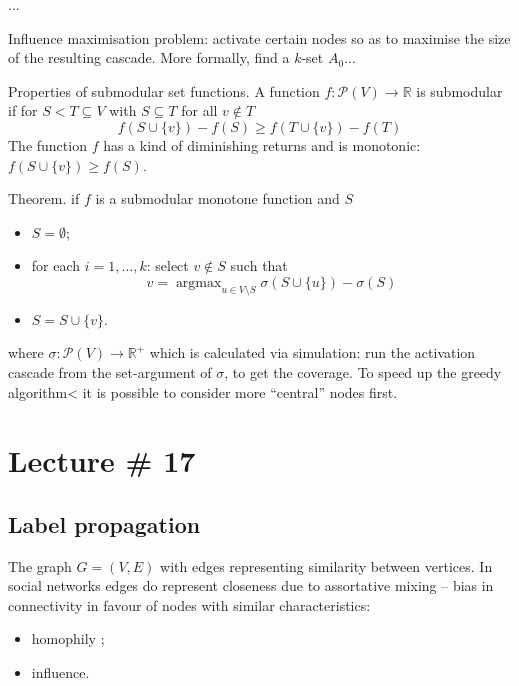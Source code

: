 \documentclass[a4paper]{article}
\newcommand{\Real}{\mathbb{R}}
\newcommand{\argmax}{\mathop{\text{argmax}}}
\begin{document}
...

Influence maximisation problem: activate certain nodes so as to maximise the size of
the resulting cascade. More formally, find a $k$-set $A_0$...

Properties of submodular set functions. A function $f:\mathcal{P}(V)\to \Real$
is submodular if for $S<T\subseteq V$ with $S\subseteq T$ for all $v\notin T$
\[
f(S\cup \{v\})-f(S)\geq f(T\cup \{v\})-f(T)
\]
The function $f$ has a kind of diminishing returns and is monotonic: $f(S\cup \{v\})\geq f(S)$.

Theorem. if $f$ is a submodular monotone function and $S$

\begin{itemize}
	\item $S=\emptyset$;
	\item for each $i=1,\ldots, k$: select $v\notin S$ such that 
		\[v = \argmax_{u\in V\setminus S} \sigma(S\cup\{u\}) - \sigma(S)\]
	\item $S = S\cup \{v\}$.
\end{itemize}
where $\sigma:\mathcal{P}(V)\to \Real^+$ which is calculated via simulation:
run the activation cascade from the set-argument of $\sigma$, to get the coverage.
To speed up the greedy algorithm< it is possible to consider more ``central'' nodes
first.


\section{Lecture \# 17} %
\label{sec:lecture_17}

\subsection{Label propagation} %
\label{sub:label_propagation}

The graph $G=(V,E)$ with edges representing similarity between vertices.
In social networks edges do represent closeness due to assortative mixing -- bias
in connectivity in favour of nodes with similar characteristics:
\begin{itemize}
	\item homophily ;
	\item influence.
\end{itemize}
\end{document}
